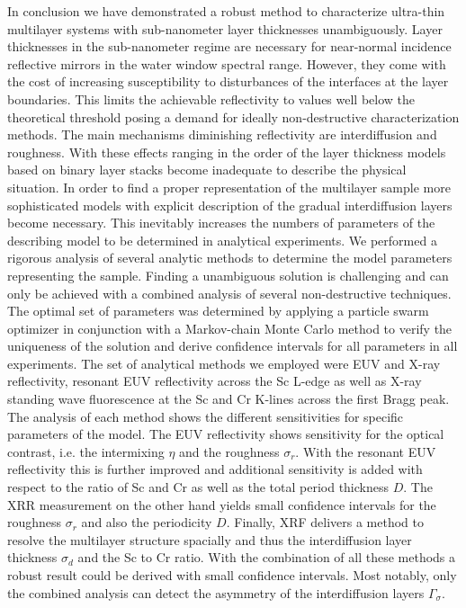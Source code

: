 In conclusion we have demonstrated a robust method to characterize ultra-thin multilayer systems with sub-nanometer layer thicknesses unambiguously. Layer thicknesses in the sub-nanometer regime are necessary for near-normal incidence reflective mirrors in the water window spectral range. However, they come with the cost of increasing susceptibility to disturbances of the interfaces at the layer boundaries. This limits the achievable reflectivity to values well below the theoretical threshold posing a demand for ideally non-destructive characterization methods. The main mechanisms diminishing reflectivity are interdiffusion and roughness. With these effects ranging in the order of the layer thickness models based on binary layer stacks become inadequate to describe the physical situation. In order to find a proper representation of the multilayer sample more sophisticated models with explicit description of the gradual interdiffusion layers become necessary. This inevitably increases the numbers of 
parameters of the describing model to be determined in analytical experiments. We performed a rigorous analysis of several analytic methods to determine the model parameters representing the sample. Finding a unambiguous solution is challenging and can only be achieved with a combined analysis of several non-destructive techniques. The optimal set of parameters was determined by applying a particle swarm optimizer in conjunction with a Markov-chain Monte Carlo method to verify the uniqueness of the solution and derive confidence intervals for all parameters in all experiments. The set of analytical methods we employed were EUV and X-ray reflectivity, resonant EUV reflectivity across the Sc L-edge as well as X-ray standing wave fluorescence at the Sc and Cr K-lines across the first Bragg peak. The analysis of each method shows the different sensitivities for specific parameters of the model. The EUV reflectivity shows sensitivity for the optical contrast, i.e. the intermixing $\eta$ and the roughness $\sigma_
r$. With the resonant EUV reflectivity this is further improved and additional sensitivity is added with respect to the ratio of Sc and Cr as well as the total period thickness $D$. The XRR measurement on the other hand yields small confidence intervals for the roughness $\sigma_r$ and also the periodicity $D$. Finally, XRF delivers a method to resolve the multilayer structure spacially and thus the interdiffusion layer thickness $\sigma_d$ and the Sc to Cr ratio. With the combination of all these methods a robust result could be derived with small confidence intervals. Most notably, only the combined analysis can detect the asymmetry of the interdiffusion layers $\Gamma_\sigma$.

